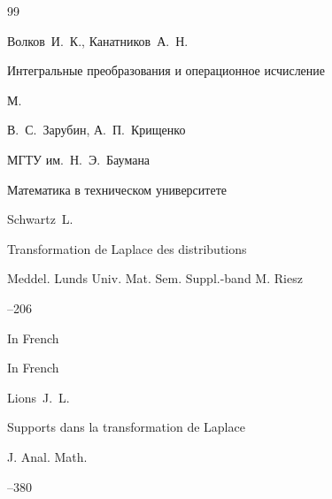 \begin{thebibliography}{99}

\by Волков~И.~К., Канатников~А.~Н.

\book Интегральные преобразования и операционное исчисление

\publaddr М.

\eds В.~С.~Зарубин, А.~П.~Крищенко 

\publ МГТУ им.~Н.~Э.~Баумана



\serial Математика в техническом университете 














\by Schwartz~L.

\paper Transformation de Laplace des distributions

\jour Meddel. Lunds Univ. Mat. Sem. Suppl.-band M. Riesz


--206 

\lang In French







\lang In French

\by Lions~J.~L.

\paper Supports dans la transformation de Laplace

\jour J. Anal. Math. 


--380 







\end{thebibliography}
